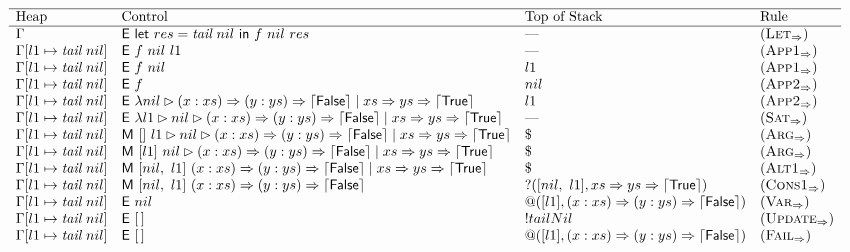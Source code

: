\begin{figure*}
  \[
    \begin{array}{llll}
      \hline
      \text{Heap}               & \text{Control}                                          & \text{Top of Stack}    & \text{Rule}            \\
      \hline
      \Gamma                    & \eval{\llet{res = \tailNil}{\app{\app{f}{nil}}{res}}}   & \text{---}             & (\smallrule{Let})      \\
      \Gamma[l1\mapsto\tailNil] & \eval{\app{\app{f}{nil}}{l1}}                           & \text{---}             & (\smallrule{App1})     \\
      \Gamma[l1\mapsto\tailNil] & \eval{\app{f}{nil}}                                     & l1                     & (\smallrule{App1})     \\
      \Gamma[l1\mapsto\tailNil] & \eval{f}                                                & nil                    & (\smallrule{App2})     \\
      \Gamma[l1\mapsto\tailNil] & \eval{\abstr{\matcharg{nil}{\lazyBody}}}                & l1                     & (\smallrule{App2})     \\
      \Gamma[l1\mapsto\tailNil] & \eval{\abstr{\matcharg{l1}{\matcharg{nil}{\lazyBody}}}} & \text{---}             & (\smallrule{Sat})      \\
      \Gamma[l1\mapsto\tailNil] & \match{[]}{\matcharg{l1}{\matcharg{nil}{\lazyBody}}}    & \$                     & (\smallrule{Arg})      \\
      \Gamma[l1\mapsto\tailNil] & \match{[l1]}{\matcharg{nil}{\lazyBody}}                 & \$                     & (\smallrule{Arg})      \\
      \Gamma[l1\mapsto\tailNil] & \match{[nil,~l1]}{\lazyBody}                            & \$                     & (\smallrule{Alt1})     \\
      \Gamma[l1\mapsto\tailNil] & \match{[nil,~l1]}{\lazyFalse}                           & ?([nil,~l1],\lazyTrue) & (\smallrule{Cons1})    \\
      \Gamma[l1\mapsto\tailNil] & \eval{nil}                                              & @([l1],\lazyFalse)     & (\smallrule{Var})      \\
      \Gamma[l1\mapsto\tailNil] & \eval{\nil}                                             & !tailNil               & (\smallrule{Update})   \\
      \Gamma[l1\mapsto\tailNil] & \eval{\nil}                                             & @([l1],\lazyFalse)     & (\smallrule{Fail})     \\

\end{array}\]
\end{figure*}
